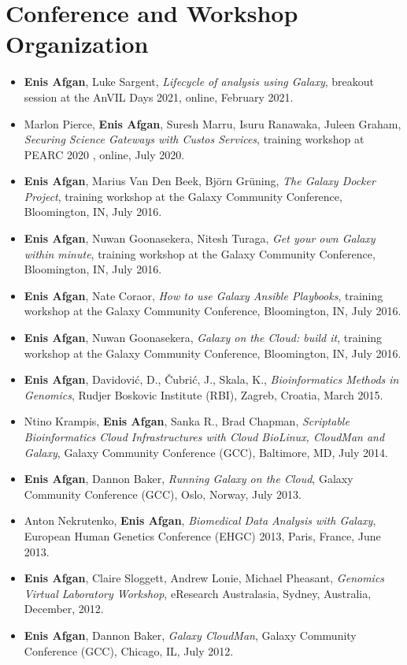 \documentclass{article}
\begin{document}
\section{Conference and Workshop Organization}
\begin {itemize}
    \item \textbf{Enis Afgan}, Luke Sargent, \textit{Lifecycle of analysis using Galaxy}, breakout session at the AnVIL Days 2021, online, February 2021.
    \item Marlon Pierce, \textbf{Enis Afgan}, Suresh Marru, Isuru Ranawaka, Juleen Graham, \textit{Securing Science Gateways with Custos Services}, training workshop at PEARC 2020 , online, July 2020.
    \item \textbf{Enis Afgan}, Marius Van Den Beek, Björn Grüning, \textit{The Galaxy Docker Project}, training workshop at the Galaxy Community Conference, Bloomington, IN, July 2016.
    \item \textbf{Enis Afgan}, Nuwan Goonasekera, Nitesh Turaga, \textit{Get your own Galaxy within minute}, training workshop at the Galaxy Community Conference, Bloomington, IN, July 2016.
    \item \textbf{Enis Afgan}, Nate Coraor, \textit{How to use Galaxy Ansible Playbooks}, training workshop at the Galaxy Community Conference, Bloomington, IN, July 2016.
    \item \textbf{Enis Afgan}, Nuwan Goonasekera,  \textit{Galaxy on the Cloud: build it}, training workshop at the Galaxy Community Conference, Bloomington, IN, July 2016.
    \item \textbf{Enis Afgan}, Davidović, D., Čubrić, J., Skala, K., \textit{Bioinformatics Methods in Genomics}, Rudjer Boskovic Institute (RBI), Zagreb, Croatia, March 2015.
    \item Ntino Krampis, \textbf{Enis Afgan}, Sanka R., Brad Chapman, \textit{Scriptable Bioinformatics Cloud Infrastructures with Cloud BioLinux, CloudMan and Galaxy}, Galaxy Community Conference (GCC), Baltimore, MD, July 2014.
    \item \textbf{Enis Afgan}, Dannon Baker,  \textit{Running Galaxy on the Cloud}, Galaxy Community Conference (GCC), Oslo, Norway, July 2013.
   \item Anton Nekrutenko, \textbf{Enis Afgan}, \textit{Biomedical Data Analysis with Galaxy}, European Human Genetics Conference (EHGC) 2013, Paris, France, June 2013.
    \item \textbf{Enis Afgan}, Claire Sloggett, Andrew Lonie, Michael Pheasant,  \textit{Genomics Virtual Laboratory Workshop}, eResearch Australasia, Sydney, Australia, December, 2012.
    \item \textbf{Enis Afgan}, Dannon Baker, \textit{Galaxy CloudMan}, Galaxy Community Conference (GCC), Chicago, IL, July 2012.
    
\end{itemize}
\end{document}
